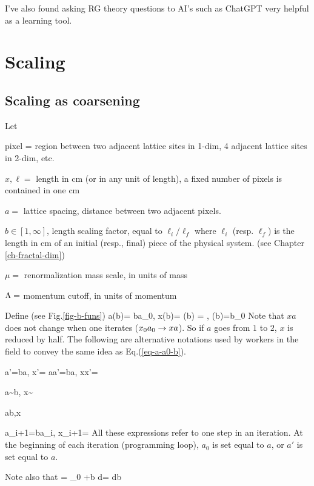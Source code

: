 I've also found asking RG theory questions to AI's such as ChatGPT very helpful
as a learning tool.




\section{Scaling}

\subsection{Scaling as coarsening}


Let 

pixel = region between two adjacent lattice sites in 1-dim,
4 adjacent lattice sites in 2-dim, etc.

$x, \ell=$ length in cm (or in any unit of length), a
fixed number of pixels is
contained in one cm

$a=$ lattice spacing, distance between two adjacent pixels.

$b\in[1, \infty]$, length scaling factor, equal to $\ell_i/\ell_f$
where $\ell_i$ (resp. $\ell_f$)
is the length in cm of an initial (resp., final) piece
of the physical system.
(see Chapter \ref{ch-fractal-dim})

$\mu=$ renormalization mass scale, in units
of mass

$\Lambda=$ momentum cutoff, in units of momentum

Define (see Fig.\ref{fig-b-funs})
\beq
a(b)= ba_0, \quad
 x(b)= 
\label{eq-a-a0-b}
\eeq
\beq
 \Lam(b) = ,
\quad
 \mu(b)=b\mu_0
\label{eq-mu-Lam-b}
\eeq
Note that $xa$ does not change when
one iterates ($x_0a_0\rightarrow xa$). So 
if $a$ goes from $1$ to $2$, 
$x$ is reduced by half.
The following are alternative notations
used by workers in the field 
to convey the
same idea as Eq.(\ref{eq-a-a0-b}).

\beq
a'=ba, \quad x'=
\eeq
\beq
a\rarrow a'=ba, \quad x\rarrow x'=
\eeq

\beq
a\sim b, \quad x\sim {}
\eeq

\beq
a\propto b,\quad x\propto {}
\eeq
 
\beq
a_{i+1}=ba_i, \quad x_{i+1}=
\eeq 
All these expressions refer to one step in an iteration.
At the beginning 
of each iteration (programming loop),
$a_0$ is set equal to $a$,
or $a'$ is set equal to $a$.


Note also that
\beq
\ln \mu 
=
\ln \mu_0 +\ln b
\implies \quad d\ln \mu = d\ln b
\eeq

